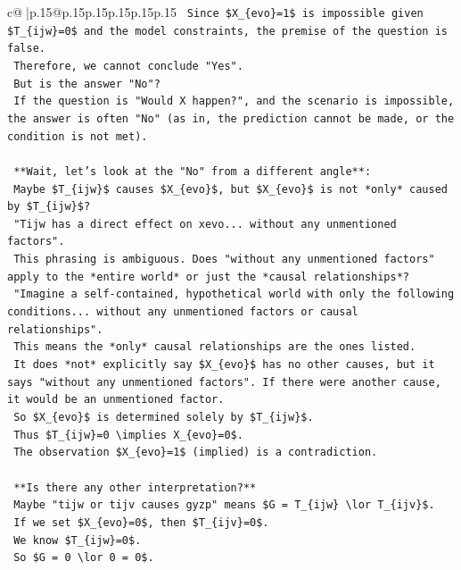 \documentclass{article}
\begin{document}
{\begin{supertabular}{c@{$\;$}|p{.15\linewidth}@{}p{.15\linewidth}p{.15\linewidth}p{.15\linewidth}p{.15\linewidth}p{.15\linewidth}}
{{{\texttt{    Since \$X\_\{evo\}=1\$ is impossible given \$T\_\{ijw\}=0\$ and the model constraints, the premise of the question is false.} \\
\texttt{    Therefore, we cannot conclude "Yes".} \\
\texttt{    But is the answer "No"?} \\
\texttt{    If the question is "Would X happen?", and the scenario is impossible, the answer is often "No" (as in, the prediction cannot be made, or the condition is not met).} \\
\\ 
\texttt{    **Wait, let's look at the "No" from a different angle**:} \\
\texttt{    Maybe \$T\_\{ijw\}\$ causes \$X\_\{evo\}\$, but \$X\_\{evo\}\$ is not *only* caused by \$T\_\{ijw\}\$?} \\
\texttt{    "Tijw has a direct effect on xevo... without any unmentioned factors".} \\
\texttt{    This phrasing is ambiguous. Does "without any unmentioned factors" apply to the *entire world* or just the *causal relationships*?} \\
\texttt{    "Imagine a self{-}contained, hypothetical world with only the following conditions... without any unmentioned factors or causal relationships".} \\
\texttt{    This means the *only* causal relationships are the ones listed.} \\
\texttt{    It does *not* explicitly say \$X\_\{evo\}\$ has no other causes, but it says "without any unmentioned factors". If there were another cause, it would be an unmentioned factor.} \\
\texttt{    So \$X\_\{evo\}\$ is determined solely by \$T\_\{ijw\}\$.} \\
\texttt{    Thus \$T\_\{ijw\}=0 \textbackslash{}implies X\_\{evo\}=0\$.} \\
\texttt{    The observation \$X\_\{evo\}=1\$ (implied) is a contradiction.} \\
\\ 
\texttt{    **Is there any other interpretation?**} \\
\texttt{    Maybe "tijw or tijv causes gyzp" means \$G = T\_\{ijw\} \textbackslash{}lor T\_\{ijv\}\$.} \\
\texttt{    If we set \$X\_\{evo\}=0\$, then \$T\_\{ijv\}=0\$.} \\
\texttt{    We know \$T\_\{ijw\}=0\$.} \\
\texttt{    So \$G = 0 \textbackslash{}lor 0 = 0\$.} \\
}}}
\end{supertabular}}
\end{document}
